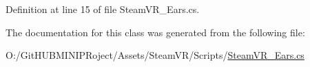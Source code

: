 Definition at line 15 of file Steam\+V\+R\+\_\+\+Ears.\+cs.



The documentation for this class was generated from the following file\+:\begin{DoxyCompactItemize}
\item 
O\+:/\+Git\+H\+U\+B\+M\+I\+N\+I\+P\+Roject/\+Assets/\+Steam\+V\+R/\+Scripts/\mbox{\hyperlink{_steam_v_r___ears_8cs}{Steam\+V\+R\+\_\+\+Ears.\+cs}}\end{DoxyCompactItemize}

